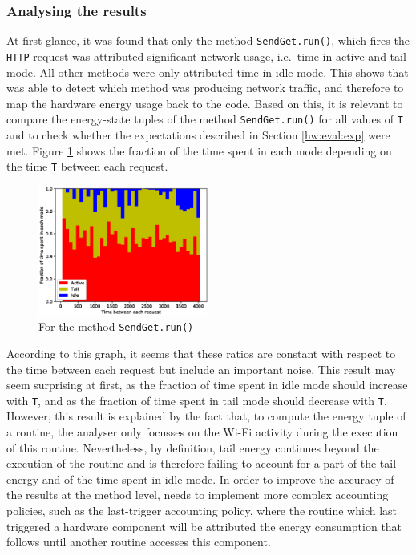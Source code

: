 \subsubsection{Analysing the results}

At first glance, it was found that only the method 
\texttt{SendGet.run()}, which fires the \texttt{HTTP} request was 
attributed significant network usage, i.e.\ time in active and tail 
mode. All other methods were only attributed time in idle mode. This 
shows that \Orka{} was able to detect which method was producing network 
traffic, and therefore to map the hardware energy usage back to the 
code. Based on this, it is relevant to compare the energy-state tuples 
of the method \texttt{SendGet.run()} for all values of \texttt{T} and to 
check whether the expectations described in Section \ref{hw:eval:exp} 
were met. Figure \ref{fig:ggl:3:meth} shows the fraction of the time 
spent in each mode depending on the time \texttt{T} between each 
request.

\begin{figure}
  \includegraphics[width=0.5\textwidth]{figures/google_method_3states.eps}
  \caption{For the method \texttt{SendGet.run()}}
  \label{fig:ggl:3:meth}
\vspace {-0.32in}
\end{figure}

According to this graph, it seems that these ratios are constant with 
respect to the time between each request but include an important noise. 
This result may seem surprising at first, as the fraction of time spent 
in idle mode should increase with \texttt{T}, and as the fraction of 
time spent in tail mode should decrease with \texttt{T}. However, this 
result is explained by the fact that, to compute the energy tuple of a 
routine, the analyser only focusses on the Wi-Fi activity during the 
execution of this routine. Nevertheless, by definition, tail energy 
continues beyond the execution of the routine and \Orka{} is therefore 
failing to account for a part of the tail energy and of the time spent 
in idle mode. In order to improve the accuracy of the results at the 
method level, \Orka{} needs to implement more complex accounting 
policies, such as the last-trigger accounting policy, where the routine 
which last triggered a hardware component will be attributed the energy 
consumption that follows until another routine accesses this component.


